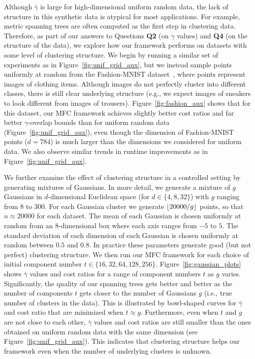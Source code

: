Although $\bar{\gamma}$ is large for high-dimensional uniform random data, the lack of structure in this synthetic data is atypical for most applications. For example, metric spanning trees are often computed as the first step in clustering data. Therefore, as part of our answers to Questions \textbf{Q2} (on $\gamma$ values) and \textbf{Q4} (on the structure of the data), we explore how our framework performs on datasets with some level of clustering structure. We begin by running a similar set of experiments as in Figure~\ref{fig:unif_grid_aux}, but we instead sample points uniformly at random from the Fashion-MNIST dataset~\cite{fashion_mnist}, where points represent images of clothing items. Although images do not perfectly cluster into different classes, there is still clear underlying structure (e.g., we expect images of sneakers to look different from images of trousers). Figure~\ref{fig:fashion_aux} shows that for this dataset, our MFC framework achieves slightly better cost ratios and far better $\gamma$-overlap bounds than for uniform random data (Figure~\ref{fig:unif_grid_aux}), even though the dimension of Fashion-MNIST points ($d = 784$) is much larger than the dimensions we considered for uniform data. We also observe similar trends in runtime improvements as in Figure~\ref{fig:unif_grid_aux}.

We further examine the effect of clustering structure in a controlled setting by generating mixtures of Gaussians. In more detail, we generate a mixture of $g$ Gaussians in $d$-dimensional Euclidean space (for $d \in \{4, 8,32\}$) with $g$ ranging from 8 to 300. For each Gaussian cluster we generate $\lfloor20000 / g\rfloor$ points, so that $n \approx 20000$ for each dataset. The mean of each Gaussian is chosen uniformly at random from an $8$-dimensional box where each axis ranges from $-5$ to $5$. The standard deviation of each dimension of each Gaussian is chosen uniformly at random between $0.5$ and $0.8$. In practice these parameters generate good (but not perfect) clustering structure. We then run our MFC framework for each choice of initial component number $t \in \{16,32,64,128,256\}$.  Figure~\ref{fig:gaussian_plots} shows $\bar{\gamma}$ values and cost ratios for a range of component numbers $t$ as $g$ varies. Significantly, the quality of our spanning trees gets better and better as the number of components $t$ gets closer to the number of Gaussians $g$ (i.e., true number of clusters in the data). This is illustrated by bowl-shaped curves for $\bar{\gamma}$ and cost ratio that are minimized when $t \approx g$. Furthermore, even when $t$ and $g$ are not close to each other, $\bar{\gamma}$ values and cost ratios are still smaller than the ones obtained on uniform random data with the same dimension (see Figure~\ref{fig:unif_grid_aux}). This indicates that clustering structure helps our framework even when the number of underlying clusters is unknown. 


